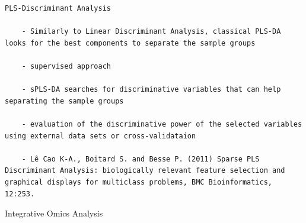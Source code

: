 \documentclass[
]{book}
\begin{document}
\begin{verbatim}
PLS-Discriminant Analysis

    - Similarly to Linear Discriminant Analysis, classical PLS-DA looks for the best components to separate the sample groups

    - supervised approach

    - sPLS-DA searches for discriminative variables that can help separating the sample groups

    - evaluation of the discriminative power of the selected variables using external data sets or cross-validataion

    - Lê Cao K-A., Boitard S. and Besse P. (2011) Sparse PLS Discriminant Analysis: biologically relevant feature selection and graphical displays for multiclass problems, BMC Bioinformatics, 12:253.
\end{verbatim}

Integrative Omics Analysis
\end{document}
